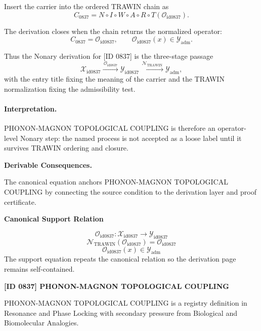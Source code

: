 Insert the carrier into the ordered TRAWIN chain as\[
C_{0837}=N\circ I\circ W\circ A\circ R\circ T(\mathcal{O}_{\mathrm{id0837}}).
\]

The derivation closes when the chain returns the normalized operator:\[
C_{0837}=\mathcal{O}_{\mathrm{id0837}},\qquad \mathcal{O}_{\mathrm{id0837}}(x)\in\mathcal{Y}_{\mathrm{adm}}.
\]

Thus the Nonary derivation for [ID 0837] is the three-stage passage
\[
\mathcal{X}_{\mathrm{id0837}}\xrightarrow{\,\mathcal{O}_{\mathrm{id0837}}\,} \mathcal{Y}_{\mathrm{id0837}}\xrightarrow{\,\mathcal{N}_{\mathrm{TRAWIN}}\,} \mathcal{Y}_{\mathrm{adm}},
\]
with the entry title fixing the meaning of the carrier and the TRAWIN normalization fixing the admissibility test.

\paragraph{Interpretation.} PHONON-MAGNON TOPOLOGICAL COUPLING is therefore an operator-level Nonary step: the named process is not accepted as a loose label until it survives TRAWIN ordering and closure.

\par\vspace{0.35em}
\noindent\textbf{Derivable Consequences.}\quad
\begingroup
\footnotesize
\raggedright
The canonical equation anchors PHONON-MAGNON TOPOLOGICAL COUPLING by connecting the source condition to the derivation layer and proof certificate.
\par\endgroup

\noindent\textbf{Canonical Support Relation}\par
\[
\mathcal{O}_{\mathrm{id0837}}:\mathcal{X}_{\mathrm{id0837}}\longrightarrow\mathcal{Y}_{\mathrm{id0837}}
\]
\[
\mathcal{N}_{\mathrm{TRAWIN}}(\mathcal{O}_{\mathrm{id0837}})=\mathcal{O}_{\mathrm{id0837}}
\]
\[
\mathcal{O}_{\mathrm{id0837}}(x)\in\mathcal{Y}_{\mathrm{adm}}
\]
\noindent The support equation repeats the canonical relation so the derivation page remains self-contained.\par

\clearpage
\noindent\textbf{[ID 0837] PHONON-MAGNON TOPOLOGICAL COUPLING}\par
\vspace{0.35em}
\begingroup\small
{}
PHONON-MAGNON TOPOLOGICAL COUPLING is a registry definition in Resonance and Phase Locking with secondary pressure from Biological and Biomolecular Analogies.

